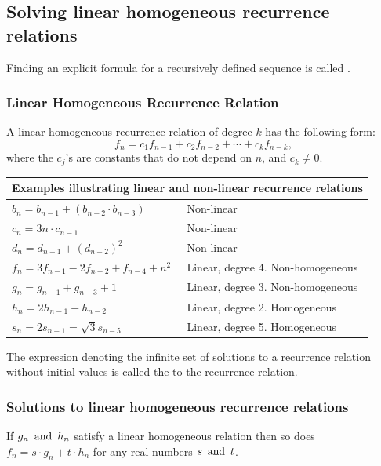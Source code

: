 \subsection{Solving linear homogeneous recurrence relations}
Finding an explicit formula for a recursively defined sequence is called .
\subsubsection*{Linear Homogeneous Recurrence Relation}
A linear homogeneous recurrence relation of degree $k$ has the following form:
\[
  f_n = c_1f_{n-1} + c_2f_{n-2} + \cdots + c_kf_{n-k},
\]
where the $c_j$'s are constants that do not depend on $n$, and $c_k \neq 0$.
\begin{center}
  \begin{tabular}{ll}
    \multicolumn{2}{c}{Examples illustrating linear and non-linear recurrence relations} \\
    \hline
    $b_n = b_{n-1} + (b_{n-2} \cdot b_{n-3})$   & Non-linear                             \\
    $c_n = 3n \cdot c_{n-1}$                    & Non-linear                             \\
    $d_n = d_{n-1} + (d_{n-2})^2$               & Non-linear                             \\
    $f_n = 3f_{n-1} - 2f_{n-2} + f_{n-4} + n^2$ & Linear, degree 4. Non-homogeneous      \\
    $g_n = g_{n-1} + g_{n-3} + 1$               & Linear, degree 3. Non-homogeneous      \\
    $h_n = 2h_{n-1} - h_{n-2}$                  & Linear, degree 2. Homogeneous          \\
    $s_n = 2s_{n-1} = \sqrt{3}s_{n-5}$          & Linear, degree 5. Homogeneous
  \end{tabular}
\end{center}
The expression denoting the infinite set of solutions to a recurrence relation without initial values is called the  to the recurrence relation.

\subsubsection*{Solutions to linear homogeneous recurrence relations}
If $g_n \operatorname{~\text{and}~} h_n$ satisfy a linear homogeneous relation then so does $f_n = s\cdot g_n + t\cdot h_n$ for any real numbers $s \operatorname{~\text{and}~} t$.

